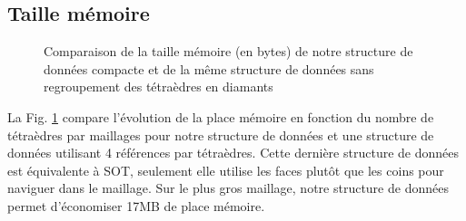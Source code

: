 \subsection{Taille mémoire}
\begin{figure}[H]
\centering
\pgfplotsset{width=13cm,height=7cm}
\caption{Comparaison de la taille mémoire (en bytes) de notre structure de données compacte et de la même structure de données sans regroupement des tétraèdres en diamants}
\label{fig:taille_memoire}
\end{figure}
\noindent
La Fig. \ref{fig:taille_memoire} compare l'évolution de la place mémoire en fonction du nombre de tétraèdres par maillages pour notre structure de données et une structure de données utilisant 4 références par tétraèdres. Cette dernière structure de données est équivalente à SOT, seulement elle utilise les faces plutôt que les coins pour naviguer dans le maillage. Sur le plus gros maillage, notre structure de données permet d'économiser 17MB de place mémoire.

%

